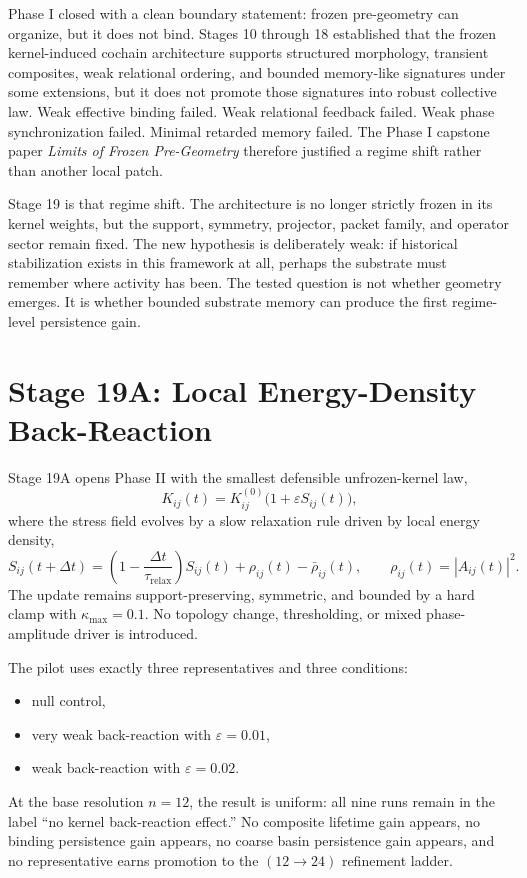 \documentclass[11pt]{article}
\begin{document}
Phase I closed with a clean boundary statement: frozen pre-geometry can organize, but it does not bind. Stages 10 through 18 established that the frozen kernel-induced cochain architecture supports structured morphology, transient composites, weak relational ordering, and bounded memory-like signatures under some extensions, but it does not promote those signatures into robust collective law. Weak effective binding failed. Weak relational feedback failed. Weak phase synchronization failed. Minimal retarded memory failed. The Phase I capstone paper \emph{Limits of Frozen Pre-Geometry} therefore justified a regime shift rather than another local patch.

Stage 19 is that regime shift. The architecture is no longer strictly frozen in its kernel weights, but the support, symmetry, projector, packet family, and operator sector remain fixed. The new hypothesis is deliberately weak: if historical stabilization exists in this framework at all, perhaps the substrate must remember where activity has been. The tested question is not whether geometry emerges. It is whether bounded substrate memory can produce the first regime-level persistence gain.

\section{Stage 19A: Local Energy-Density Back-Reaction}

Stage 19A opens Phase II with the smallest defensible unfrozen-kernel law,
\[
K_{ij}(t)=K^{(0)}_{ij}\bigl(1+\varepsilon S_{ij}(t)\bigr),
\]
where the stress field evolves by a slow relaxation rule driven by local energy density,
\[
S_{ij}(t+\Delta t)=\left(1-\frac{\Delta t}{\tau_{\mathrm{relax}}}\right)S_{ij}(t)+\rho_{ij}(t)-\bar\rho_{ij}(t),
\qquad \rho_{ij}(t)=|A_{ij}(t)|^2.
\]
The update remains support-preserving, symmetric, and bounded by a hard clamp with $\kappa_{\max}=0.1$. No topology change, thresholding, or mixed phase-amplitude driver is introduced.

The pilot uses exactly three representatives and three conditions:
\begin{itemize}
\item null control,
\item very weak back-reaction with $\varepsilon=0.01$,
\item weak back-reaction with $\varepsilon=0.02$.
\end{itemize}
At the base resolution $n=12$, the result is uniform: all nine runs remain in the label ``no kernel back-reaction effect.'' No composite lifetime gain appears, no binding persistence gain appears, no coarse basin persistence gain appears, and no representative earns promotion to the $(12\rightarrow24)$ refinement ladder.
\end{document}

